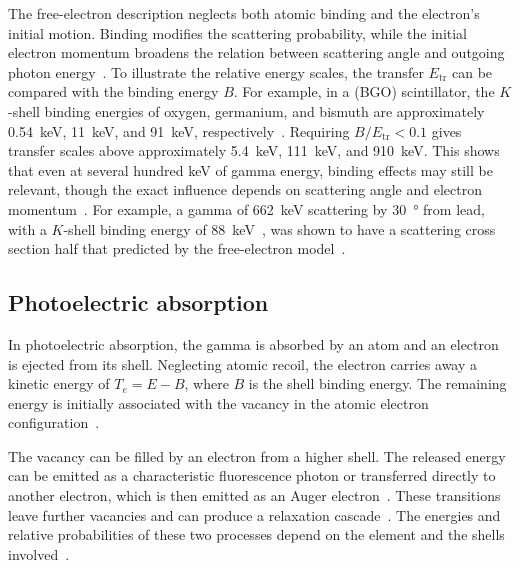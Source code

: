 The free-electron description neglects both atomic binding and the electron's initial motion. Binding modifies the scattering probability, while the initial electron momentum broadens the relation between scattering angle and outgoing photon energy~\parencite{liang2020transport}. To illustrate the relative energy scales, the transfer $E_{\mathrm{tr}}$ can be compared with the binding energy $B$. For example, in a  (BGO) scintillator, the $K$-shell binding energies of oxygen, germanium, and bismuth are approximately \qty{0.54}{\kilo\electronvolt}, \qty{11}{\kilo\electronvolt}, and \qty{91}{\kilo\electronvolt}, respectively~\parencite[table 1-1]{williams2009binding}. Requiring $B/E_{\mathrm{tr}}<0.1$ gives transfer scales above approximately \qty{5.4}{\kilo\electronvolt}, \qty{111}{\kilo\electronvolt}, and \qty{910}{\kilo\electronvolt}. This shows that even at several hundred \unit{\kilo\electronvolt} of gamma energy, binding effects may still be relevant, though the exact influence depends on scattering angle and electron momentum~\parencite[eqs.~(7)--(11)]{liang2020transport}. For example, a gamma of \qty{662}{\kilo\electronvolt} scattering by \qty{30}{\degree} from lead, with a $K$-shell binding energy of \qty{88}{\kilo\electronvolt}~\parencite[table 1-1]{williams2009binding}, was shown to have a scattering cross section half that predicted by the free-electron model~\parencite[table I]{wolff1989compton}.

\subsection{Photoelectric absorption}

In photoelectric absorption, the gamma is absorbed by an atom and an electron is ejected from its shell. Neglecting atomic recoil, the electron carries away a kinetic energy of $T_e=E-B$, where $B$ is the shell binding energy. The remaining energy is initially associated with the vacancy in the atomic electron configuration~\parencite{ballabriga2016review}.

The vacancy can be filled by an electron from a higher shell. The released energy can be emitted as a characteristic fluorescence photon or transferred directly to another electron, which is then emitted as an Auger electron~\parencite{ballabriga2016review}. These transitions leave further vacancies and can produce a relaxation cascade~\parencite{soronen2024photoionizationauger}. The energies and relative probabilities of these two processes depend on the element and the shells involved~\parencite{ballabriga2016review,soronen2024photoionizationauger}.

